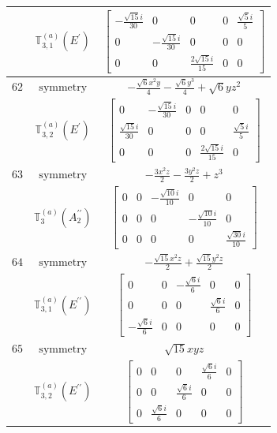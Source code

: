 \documentclass[fleqn,8pt,landscape]{jsarticle}
\begin{document}
\begin{longtable}{ccc}
$  $ & $ \mathbb{T}_{3,1}^{(a)}(E^{\prime}) $ & $ \begin{bmatrix} - \frac{\sqrt{15} i}{30} & 0 & 0 & 0 & \frac{\sqrt{5} i}{5} \\ 0 & - \frac{\sqrt{15} i}{30} & 0 & 0 & 0 \\ 0 & 0 & \frac{2 \sqrt{15} i}{15} & 0 & 0 \end{bmatrix} $ \\ \hline
$ 62 $ & $ \text{symmetry} $ & $ - \frac{\sqrt{6} x^{2} y}{4} - \frac{\sqrt{6} y^{3}}{4} + \sqrt{6} y z^{2} $ \\
$  $ & $ \mathbb{T}_{3,2}^{(a)}(E^{\prime}) $ & $ \begin{bmatrix} 0 & - \frac{\sqrt{15} i}{30} & 0 & 0 & 0 \\ \frac{\sqrt{15} i}{30} & 0 & 0 & 0 & \frac{\sqrt{5} i}{5} \\ 0 & 0 & 0 & \frac{2 \sqrt{15} i}{15} & 0 \end{bmatrix} $ \\ \hline
$ 63 $ & $ \text{symmetry} $ & $ - \frac{3 x^{2} z}{2} - \frac{3 y^{2} z}{2} + z^{3} $ \\
$  $ & $ \mathbb{T}_{3}^{(a)}(A_{2}^{\prime\prime}) $ & $ \begin{bmatrix} 0 & 0 & - \frac{\sqrt{10} i}{10} & 0 & 0 \\ 0 & 0 & 0 & - \frac{\sqrt{10} i}{10} & 0 \\ 0 & 0 & 0 & 0 & \frac{\sqrt{30} i}{10} \end{bmatrix} $ \\ \hline
$ 64 $ & $ \text{symmetry} $ & $ - \frac{\sqrt{15} x^{2} z}{2} + \frac{\sqrt{15} y^{2} z}{2} $ \\
$  $ & $ \mathbb{T}_{3,1}^{(a)}(E^{\prime\prime}) $ & $ \begin{bmatrix} 0 & 0 & - \frac{\sqrt{6} i}{6} & 0 & 0 \\ 0 & 0 & 0 & \frac{\sqrt{6} i}{6} & 0 \\ - \frac{\sqrt{6} i}{6} & 0 & 0 & 0 & 0 \end{bmatrix} $ \\ \hline
$ 65 $ & $ \text{symmetry} $ & $ \sqrt{15} x y z $ \\
$  $ & $ \mathbb{T}_{3,2}^{(a)}(E^{\prime\prime}) $ & $ \begin{bmatrix} 0 & 0 & 0 & \frac{\sqrt{6} i}{6} & 0 \\ 0 & 0 & \frac{\sqrt{6} i}{6} & 0 & 0 \\ 0 & \frac{\sqrt{6} i}{6} & 0 & 0 & 0 \end{bmatrix} $ \\ \hline

\end{longtable}
\end{document}
